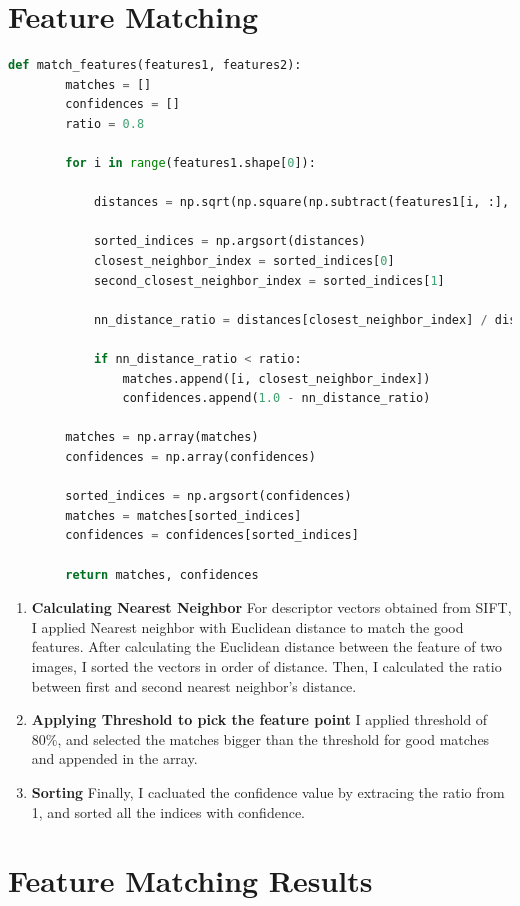 \section*{Feature Matching}
\begin{lstlisting}[language=python]
    def match_features(features1, features2):
        matches = []
        confidences = []
        ratio = 0.8

        for i in range(features1.shape[0]):

            distances = np.sqrt(np.square(np.subtract(features1[i, :], features2)).sum(axis=1))

            sorted_indices = np.argsort(distances)
            closest_neighbor_index = sorted_indices[0]
            second_closest_neighbor_index = sorted_indices[1]

            nn_distance_ratio = distances[closest_neighbor_index] / distances[second_closest_neighbor_index]

            if nn_distance_ratio < ratio:
                matches.append([i, closest_neighbor_index])
                confidences.append(1.0 - nn_distance_ratio)

        matches = np.array(matches)
        confidences = np.array(confidences)

        sorted_indices = np.argsort(confidences)
        matches = matches[sorted_indices]
        confidences = confidences[sorted_indices]

        return matches, confidences
\end{lstlisting}
\begin{enumerate}
    \item \textbf{Calculating Nearest Neighbor} For descriptor vectors obtained from SIFT, I applied Nearest neighbor with Euclidean distance to match the good features. After calculating the Euclidean distance between the feature of two images, I sorted the vectors in order of distance. Then, I calculated the ratio between first and second nearest neighbor's distance.
    \item \textbf{Applying Threshold to pick the feature point} I applied threshold of 80\%, and selected the matches bigger than the threshold for good matches and appended in the array.
    \item \textbf{Sorting} Finally, I cacluated the confidence value by extracing the ratio from 1, and sorted all the indices with confidence.
\end{enumerate}

\section*{Feature Matching Results}

